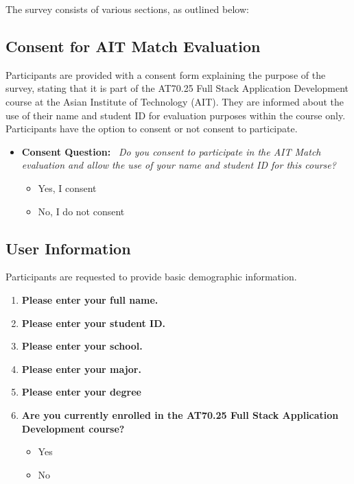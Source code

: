 The survey consists of various sections, as outlined below:

\subsection{Consent for AIT Match Evaluation}

Participants are provided with a consent form explaining the purpose of the survey, stating that it is part of the AT70.25 Full Stack Application Development course at the Asian Institute of Technology (AIT). They are informed about the use of their name and student ID for evaluation purposes within the course only. Participants have the option to consent or not consent to participate.

\begin{itemize}
\item \textbf{Consent Question:} \
\textit{Do you consent to participate in the AIT Match evaluation and allow the use of your name and student ID for this course?}
\begin{itemize}
\item Yes, I consent
\item No, I do not consent
\end{itemize}
\end{itemize}

\subsection{User Information}

Participants are requested to provide basic demographic information.

\begin{enumerate}
\item \textbf{Please enter your full name.}
\item \textbf{Please enter your student ID.}
\item \textbf{Please enter your school.}
\item \textbf{Please enter your major.}
\item \textbf{Please enter your degree}
\item \textbf{Are you currently enrolled in the AT70.25 Full Stack Application Development course?}
\begin{itemize}
\item Yes
\item No
\end{itemize}
\end{enumerate}

